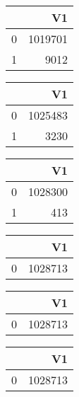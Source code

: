 \bigskip\bigskip
\centering
\begin{tabular}{rr}
  \hline
 & V1 \\ 
  \hline
0 & 1019701 \\ 
  1 & 9012 \\ 
   \hline
\end{tabular}

\bigskip\bigskip
\centering
\begin{tabular}{rr}
  \hline
 & V1 \\ 
  \hline
0 & 1025483 \\ 
  1 & 3230 \\ 
   \hline
\end{tabular}

\bigskip\bigskip
\centering
\begin{tabular}{rr}
  \hline
 & V1 \\ 
  \hline
0 & 1028300 \\ 
  1 & 413 \\ 
   \hline
\end{tabular}

\bigskip\bigskip
\centering
\begin{tabular}{rr}
  \hline
 & V1 \\ 
  \hline
0 & 1028713 \\ 
   \hline
\end{tabular}

\bigskip\bigskip
\centering
\begin{tabular}{rr}
  \hline
 & V1 \\ 
  \hline
0 & 1028713 \\ 
   \hline
\end{tabular}

\bigskip\bigskip
\centering
\begin{tabular}{rr}
  \hline
 & V1 \\ 
  \hline
0 & 1028713 \\ 
   \hline
\end{tabular}

